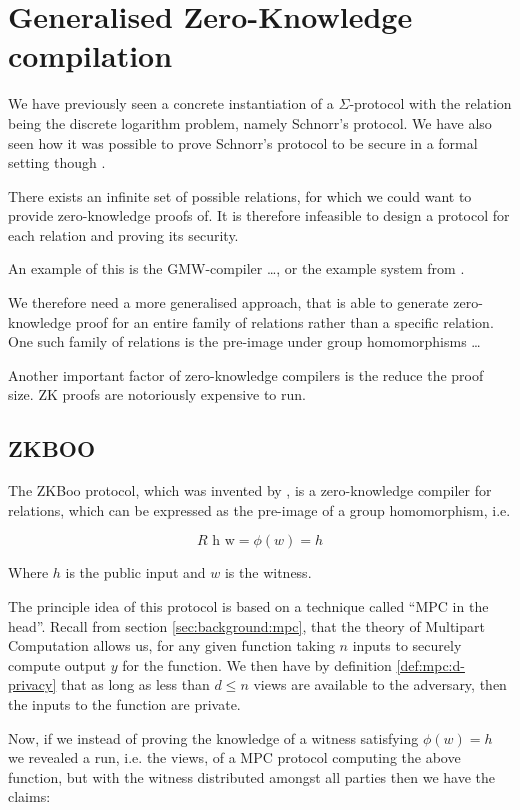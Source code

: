 \chapter{Generalised Zero-Knowledge compilation}
\label{ch:general_zk}
We have previously seen a concrete instantiation of a $\Sigma$-protocol with the
relation being the discrete logarithm problem, namely Schnorr's protocol. We
have also seen how it was possible to prove Schnorr's protocol to be secure in a
formal setting though \easycrypt.


There exists an infinite set of possible relations, for which we could want to
provide zero-knowledge proofs of. It is therefore infeasible to design a
protocol for each relation and proving its security.

An example of this is the GMW-compiler \dots, or the example system from \cite{zkcrypt}.

We therefore need a more generalised approach, that is able to generate
zero-knowledge proof for an entire family of relations rather than a specific relation.
One such family of relations is the pre-image under group homomorphisms \dots

Another important factor of zero-knowledge compilers is the reduce the proof
size. ZK proofs are notoriously expensive to run.

\section{ZKBOO}
\label{sec:zkboo}
The ZKBoo protocol, which was invented by \citet{zkboo}, is a zero-knowledge compiler for relations, which can be
expressed as the pre-image of a group homomorphism, i.e.

\[
  R \text{ h w} = \phi(w) = h
\]

Where $h$ is the public input and $w$ is the witness.

The principle idea of this protocol is based on a technique called ``MPC in the
head''. Recall from section \ref{sec:background:mpc}, that the theory of
Multipart Computation allows us, for any given function taking $n$ inputs to
securely compute output $y$ for the function. We then have by definition
\ref{def:mpc:d-privacy} that as long as less than $d \leq n$ views are available to the adversary, then the inputs to the function are private.

Now, if we instead of proving the knowledge of a witness satisfying $\phi(w) = h$
we revealed a run, i.e. the views, of a MPC protocol computing the above
function, but with the witness distributed amongst all parties then we have the
claims:

